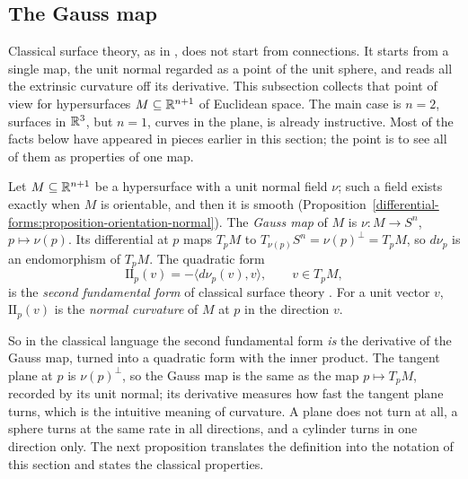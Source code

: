 \subsection{The Gauss map}\label{riemannian-geometry:subsection-gauss-map}

Classical surface theory, as in \cite[Chapter 3]{do-carmo-curves-surfaces}, does not start from connections. It starts from a single map, the unit normal regarded as a point of the unit sphere, and
reads all the extrinsic curvature off its derivative. This subsection collects that point of view for hypersurfaces $M \subseteq \mathbb{R}^{n+1}$ of Euclidean space. The main case is $n = 2$, surfaces in $\mathbb{R}^3$,
but $n = 1$, curves in the plane, is already instructive. Most of the facts below have appeared in pieces earlier in this section; the point is to see all of them as properties of one map.

\begin{definition}\label{riemannian-geometry:definition-gauss-map}
Let $M \subseteq \mathbb{R}^{n+1}$ be a hypersurface with a unit normal field $\nu$; such a field exists exactly when $M$ is orientable, and then it is smooth
(Proposition~\ref{differential-forms:proposition-orientation-normal}). The \emph{Gauss map} of $M$ is $\nu \colon M \to S^n$, $p \mapsto \nu(p)$. Its differential at $p$ maps $T_pM$ to
$T_{\nu(p)}S^n = \nu(p)^\perp = T_pM$, so $d\nu_p$ is an endomorphism of $T_pM$. The quadratic form
\[
\mathrm{II}_p(v) = -\langle d\nu_p(v), v\rangle, \qquad v \in T_pM,
\]
is the \emph{second fundamental form} of classical surface theory \cite[Section 3-2]{do-carmo-curves-surfaces}. For a unit vector $v$, $\mathrm{II}_p(v)$ is the \emph{normal curvature} of $M$ at $p$ in the
direction $v$.
\end{definition}

So in the classical language the second fundamental form \emph{is} the derivative of the Gauss map, turned into a quadratic form with the inner product. The tangent plane at $p$ is $\nu(p)^\perp$, so the
Gauss map is the same as the map $p \mapsto T_pM$, recorded by its unit normal; its derivative measures how fast the tangent plane turns, which is the intuitive meaning of curvature. A plane does not turn at
all, a sphere turns at the same rate in all directions, and a cylinder turns in one direction only. The next proposition translates the definition into the notation of this section and states the
classical properties.

